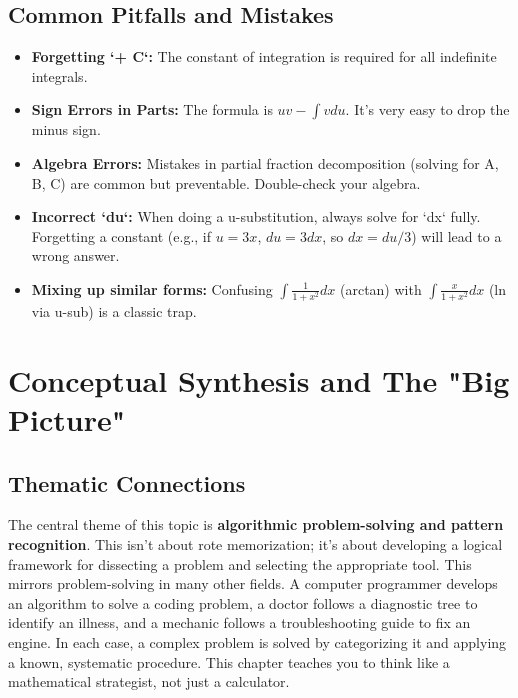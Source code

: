 \documentclass{article}
\begin{document}
\subsection{Common Pitfalls and Mistakes}
\begin{itemize}
    \item \textbf{Forgetting `+ C`:} The constant of integration is required for all indefinite integrals.
    \item \textbf{Sign Errors in Parts:} The formula is $uv - \int v du$. It's very easy to drop the minus sign.
    \item \textbf{Algebra Errors:} Mistakes in partial fraction decomposition (solving for A, B, C) are common but preventable. Double-check your algebra.
    \item \textbf{Incorrect `du`:} When doing a u-substitution, always solve for `dx` fully. Forgetting a constant (e.g., if $u=3x$, $du=3dx$, so $dx = du/3$) will lead to a wrong answer.
    \item \textbf{Mixing up similar forms:} Confusing $\int \frac{1}{1+x^2}dx$ (arctan) with $\int \frac{x}{1+x^2}dx$ (ln via u-sub) is a classic trap.
\end{itemize}

\section{Conceptual Synthesis and The "Big Picture"}
\subsection{Thematic Connections}
The central theme of this topic is \textbf{algorithmic problem-solving and pattern recognition}. This isn't about rote memorization; it's about developing a logical framework for dissecting a problem and selecting the appropriate tool. This mirrors problem-solving in many other fields. A computer programmer develops an algorithm to solve a coding problem, a doctor follows a diagnostic tree to identify an illness, and a mechanic follows a troubleshooting guide to fix an engine. In each case, a complex problem is solved by categorizing it and applying a known, systematic procedure. This chapter teaches you to think like a mathematical strategist, not just a calculator.
\end{document}
